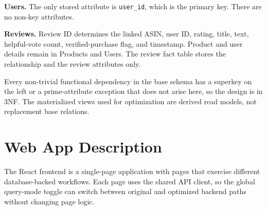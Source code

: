 \documentclass[10pt]{article}
\begin{document}
\textbf{Users.} The only stored attribute is \texttt{user\_id}, which is the
primary key. There are no non-key attributes.

\textbf{Reviews.} Review ID determines the linked ASIN, user ID, rating, title,
text, helpful-vote count, verified-purchase flag, and timestamp. Product and
user details remain in Products and Users. The review fact table stores the
relationship and the review attributes only.

Every non-trivial functional dependency in the base schema has a superkey on the
left or a prime-attribute exception that does not arise here, so the design is
in 3NF. The materialized views used for optimization are derived read models,
not replacement base relations.

\section{Web App Description}
The React frontend is a single-page application with pages that exercise
different database-backed workflows. Each page uses the shared API client, so
the global query-mode toggle can switch between original and optimized backend
paths without changing page logic.
\end{document}
